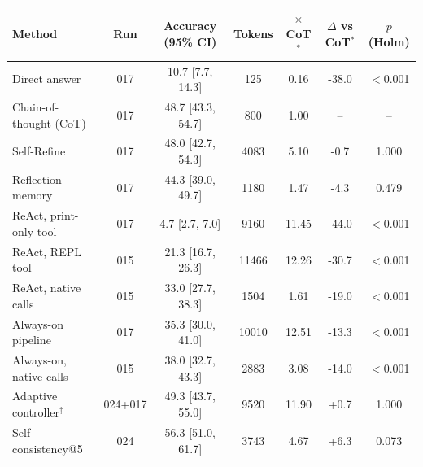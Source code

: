 \begin{tabular}{lcccccc}
\toprule
Method & Run & Accuracy (95\% CI) & Tokens & $\times$CoT$^\ast$ & $\Delta$ vs CoT$^\ast$ & $p$ (Holm) \\
\midrule
Direct answer & 017 & 10.7 [7.7, 14.3] & 125 & 0.16 & -38.0 & $<$0.001 \\
Chain-of-thought (CoT) & 017 & 48.7 [43.3, 54.7] & 800 & 1.00 & -- & -- \\
Self-Refine & 017 & 48.0 [42.7, 54.3] & 4083 & 5.10 & -0.7 & 1.000 \\
Reflection memory & 017 & 44.3 [39.0, 49.7] & 1180 & 1.47 & -4.3 & 0.479 \\
ReAct, print-only tool & 017 & 4.7 [2.7, 7.0] & 9160 & 11.45 & -44.0 & $<$0.001 \\
ReAct, REPL tool & 015 & 21.3 [16.7, 26.3] & 11466 & 12.26 & -30.7 & $<$0.001 \\
ReAct, native calls & 015 & 33.0 [27.7, 38.3] & 1504 & 1.61 & -19.0 & $<$0.001 \\
Always-on pipeline & 017 & 35.3 [30.0, 41.0] & 10010 & 12.51 & -13.3 & $<$0.001 \\
Always-on, native calls & 015 & 38.0 [32.7, 43.3] & 2883 & 3.08 & -14.0 & $<$0.001 \\
Adaptive controller$^\ddagger$ & 024+017 & 49.3 [43.7, 55.0] & 9520 & 11.90 & +0.7 & 1.000 \\
Self-consistency@5 & 024 & 56.3 [51.0, 61.7] & 3743 & 4.67 & +6.3 & 0.073 \\
\bottomrule
\end{tabular}
